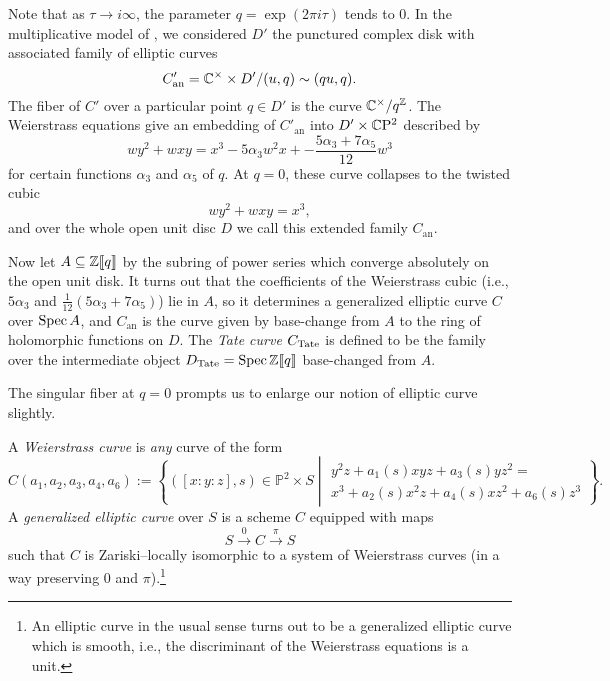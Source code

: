 \begin{definition}
Note that as $\tau \to i \infty$, the parameter $q = \exp(2 \pi i \tau)$ tends to $0$.  In the multiplicative model of , we considered $D'$ the punctured complex disk with associated family of elliptic curves \[C'_{\mathrm{an}} = \mathbb{C}^\times \times D' / (u, q) \sim (qu, q).\]  The fiber of $C'$ over a particular point $q \in D'$ is the curve $\mathbb{C}^\times / q^{\mathbb Z}$. %
The Weierstrass equations give an embedding of $C'_{\mathrm{an}}$ into $D' \times \mathbb{C}\mathrm P^2$ described by \[wy^2 + wxy = x^3 - 5 \alpha_3 w^2 x + -\frac{5 \alpha_3 + 7 \alpha_5}{12}w^3\] for certain functions $\alpha_3$ and $\alpha_5$ of $q$.  At $q = 0$, these curve collapses to the twisted cubic \[wy^2 + wxy = x^3,\] and over the whole open unit disc $D$ we call this extended family $C_{\mathrm{an}}$.

Now let $A \subseteq \mathbb Z\llbracket{q}\rrbracket$ by the subring of power series which converge absolutely on the open unit disk.  It turns out that the coefficients of the Weierstrass cubic (i.e., $5\alpha_3$ and $\frac{1}{12}(5\alpha_3+7\alpha_5)$) lie in $A$, so it determines a generalized elliptic curve $C$ over $\operatorname{Spec} A$, and $C_{\mathrm{an}}$ is the curve given by base-change from $A$ to the ring of holomorphic functions on $D$.  The \textit{Tate curve} $C_{\mathrm{Tate}}$ is defined to be the family over the intermediate object $D_{\mathrm{Tate}} = \operatorname{Spec} \mathbb Z\llbracket{q}\rrbracket$ base-changed from $A$.
\end{definition}

The singular fiber at $q = 0$ prompts us to enlarge our notion of elliptic curve slightly.

\begin{definition}
A \textit{Weierstrass curve} is \emph{any} curve of the form \[C(a_1, a_2, a_3, a_4, a_6) := \left\{ ([x : y : z], s) \in \mathbb P^2 \times S \middle| \begin{array}{c} y^2 z + a_1(s) xyz + a_3(s) yz^2 = \\ x^3 + a_2(s) x^2 z + a_4(s) x z^2 + a_6(s) z^3 \end{array} \right\}.\]  A \textit{generalized elliptic curve} over $S$ is a scheme $C$ equipped with maps \[S \xrightarrow{0} C \xrightarrow{\pi} S\] such that $C$ is Zariski--locally isomorphic to a system of Weierstrass curves (in a way preserving $0$ and $\pi$).\footnote{An elliptic curve in the usual sense turns out to be a generalized elliptic curve which is smooth, i.e., the discriminant of the Weierstrass equations is a unit.}
\end{definition}

